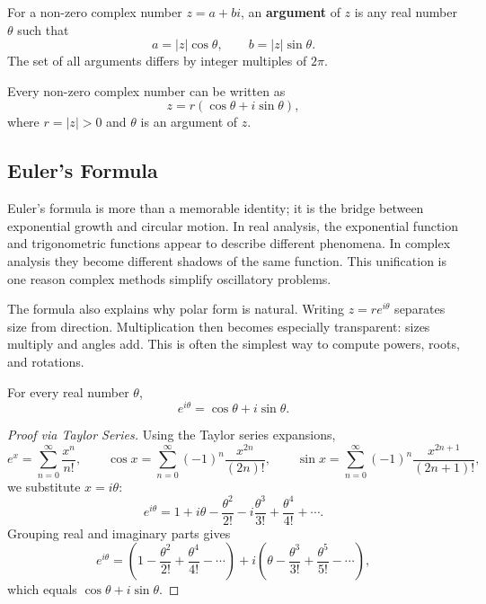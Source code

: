 \begin{definition}[Argument]
For a non-zero complex number $z=a+bi$, an \textbf{argument} of $z$ is any real number $\theta$ such that
\[
    a=|z|\cos\theta,
    \qquad
    b=|z|\sin\theta.
\]
The set of all arguments differs by integer multiples of $2\pi$.
\end{definition}

\begin{definition}
Every non-zero complex number can be written as
\[
    z=r(\cos\theta+i\sin\theta),
\]
where $r=|z|>0$ and $\theta$ is an argument of $z$.
\end{definition}

\subsection{Euler's Formula}


Euler's formula is more than a memorable identity; it is the bridge between exponential growth and circular motion. In real analysis, the exponential function and trigonometric functions appear to describe different phenomena. In complex analysis they become different shadows of the same function. This unification is one reason complex methods simplify oscillatory problems.

The formula also explains why polar form is natural. Writing $z=re^{i\theta}$ separates size from direction. Multiplication then becomes especially transparent: sizes multiply and angles add. This is often the simplest way to compute powers, roots, and rotations.

\begin{theorem}
For every real number $\theta$,
\[
    e^{i\theta}=\cos\theta+i\sin\theta.
\]
\end{theorem}

\begin{proof}[Proof via Taylor Series]
Using the Taylor series expansions,
\[
    e^x=\sum_{n=0}^{\infty}\frac{x^n}{n!},
    \qquad
    \cos x=\sum_{n=0}^{\infty}(-1)^n\frac{x^{2n}}{(2n)!},
    \qquad
    \sin x=\sum_{n=0}^{\infty}(-1)^n\frac{x^{2n+1}}{(2n+1)!},
\]
we substitute $x=i\theta$:
\[
    e^{i\theta}=1+i\theta-\frac{\theta^2}{2!}-i\frac{\theta^3}{3!}+\frac{\theta^4}{4!}+\cdots.
\]
Grouping real and imaginary parts gives
\[
    e^{i\theta}=\left(1-\frac{\theta^2}{2!}+\frac{\theta^4}{4!}-\cdots\right)
    +i\left(\theta-\frac{\theta^3}{3!}+\frac{\theta^5}{5!}-\cdots\right),
\]
which equals $\cos\theta+i\sin\theta$.
\end{proof}

